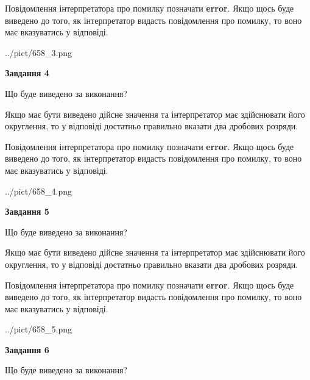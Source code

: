 \documentclass[12pt, ukrainian]{article}
\begin{document}
{\begin {Large}
Повідомлення інтерпретатора про помилку позначати \textbf{error}.
Якщо щось буде виведено до того, як інтерпретатор видасть повідомлення про помилку, 
то воно має вказуватись у відповіді. \par

\begin{center}
	{../pict/658_3.png}
\end{center}
\newpage

{\begin {center}\textbf{Завдання 4}\end {center}}\par
Що буде виведено за виконання? \par

Якщо має бути виведено дійсне значення та інтерпретатор має здійснювати його округлення, 
то у відповіді достатньо правильно вказати два дробових розряди.

Повідомлення інтерпретатора про помилку позначати \textbf{error}.
Якщо щось буде виведено до того, як інтерпретатор видасть повідомлення про помилку, 
то воно має вказуватись у відповіді. \par

\begin{center}
	{../pict/658_4.png}
\end{center}
\newpage

{\begin {center}\textbf{Завдання 5}\end {center}}\par
Що буде виведено за виконання? \par

Якщо має бути виведено дійсне значення та інтерпретатор має здійснювати його округлення, 
то у відповіді достатньо правильно вказати два дробових розряди.

Повідомлення інтерпретатора про помилку позначати \textbf{error}.
Якщо щось буде виведено до того, як інтерпретатор видасть повідомлення про помилку, 
то воно має вказуватись у відповіді. \par

\begin{center}
	{../pict/658_5.png}
\end{center}
\newpage

{\begin {center}\textbf{Завдання 6}\end {center}}\par
Що буде виведено за виконання? \par


\end{Large}}
\end{document}
